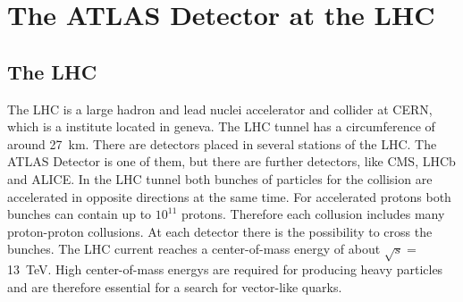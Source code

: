 \chapter{The ATLAS Detector at the LHC}

\section{The LHC}
The LHC \cite{LHC} is a large hadron and lead nuclei accelerator and collider at CERN, which is a institute located in geneva.
The LHC tunnel has a circumference of around \SI{27}{km}. 
There are detectors placed in several stations of the LHC.
The ATLAS Detector is one of them, but there are further detectors, like CMS, LHCb and ALICE.
In the LHC tunnel both bunches of particles for the collision are accelerated in opposite directions at the same time.
For accelerated protons both bunches can contain up to $10^{11}$ protons.
Therefore each collusion includes many proton-proton collusions.
At each detector there is the possibility to cross the bunches. 
The LHC current reaches a center-of-mass energy of about $\sqrt{s} =$\SI{13}{TeV}. 
High center-of-mass energys are required for producing heavy particles and are therefore essential for a search for vector-like quarks.



